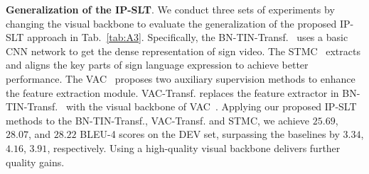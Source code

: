 \documentclass[10pt,twocolumn,letterpaper]{article}
\begin{document}
    \smallskip
    \noindent \textbf{Generalization of the IP-SLT}. 
    We conduct three sets of experiments by changing the visual backbone to evaluate the generalization of the proposed IP-SLT approach in Tab.~\ref{tab:A3}. Specifically, the BN-TIN-Transf.~\cite{zhou2021improving} uses a basic CNN network to get the dense representation of sign video. The STMC~\cite{zhou2021spatial} extracts and aligns the key parts of sign language expression to achieve better performance. The VAC~\cite{min2021visual} proposes two auxiliary supervision methods to enhance the feature extraction module.
    VAC-Transf. replaces the feature extractor in BN-TIN-Transf.~\cite{zhou2021improving} with the visual backbone of VAC~\cite{min2021visual}.
    Applying our proposed IP-SLT methods to the BN-TIN-Transf., VAC-Transf. and STMC, we achieve $25.69$, $28.07$, and $28.22$ BLEU-4 scores on the DEV set, surpassing the baselines by $3.34$, $4.16$, $3.91$, respectively. Using a high-quality visual backbone delivers further quality gains.
 
    \setlength{\tabcolsep}{5.0pt}
    \begin{table}[!t]
     \scriptsize
     \vspace{0.5mm}
     \caption{The weight $\beta$ of the original visual feature to the previous prototype. `0.0' denotes the assessment of the baseline. `-' denotes setting $\beta$ as $0.5$ without using the drop-net~\cite{zhu2020incorporating}.}
     \label{tab:A7}
     \vspace{-1mm}
     \end{table}  
     
\end{document}

